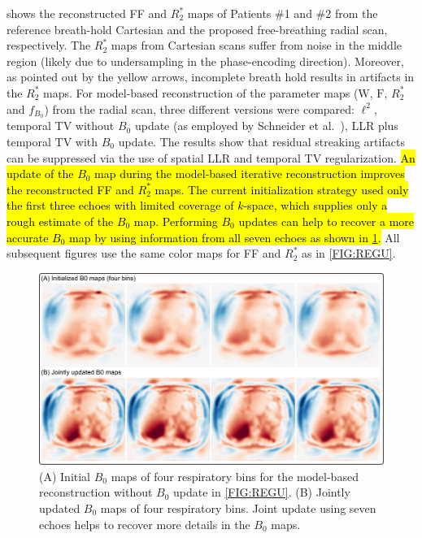 \documentclass[journal,twoside,web]{ieeecolor}
\begin{document}
 shows the reconstructed FF and $R_2^*$ maps of Patients \#1 and \#2
from the reference breath-hold Cartesian and the proposed free-breathing radial scan, 
respectively. 
The $R_2^*$ maps from Cartesian scans suffer from noise in the middle region 
(likely due to undersampling in the phase-encoding direction). 
Moreover, as pointed out by the yellow arrows, 
incomplete breath hold results in artifacts in the $R_2^*$ maps.
For model-based reconstruction of the parameter
maps ($\mathrm{W}$, $\mathrm{F}$, $R_2^*$ and $f_{B_0}$) 
from the radial scan, three different versions were compared: 
$\ell^2$, temporal TV without $B_0$ update 
(as employed by Schneider et al.~\cite{schneider_2020_mobawfr2s}), 
LLR plus temporal TV with $B_0$ update. 
The results show that residual streaking artifacts can be suppressed 
via the use of spatial LLR and temporal TV regularization.
\hl{An update of the $B_0$ map during the model-based iterative reconstruction
improves the reconstructed FF and $R_2^*$ maps. The current initialization
strategy used 
only the first three echoes with limited coverage of $k$-space, 
which supplies only a rough estimate of the $B_0$ map.
Performing $B_0$ updates can help to recover a more accurate $B_0$ map
by using information from all seven echoes as shown in \mbox{\cref{FIG:B0}}.}
All subsequent figures use 
the same color maps for FF and $R_2^*$ as in \cref{FIG:REGU}.

\begin{figure}
	\centering
	\includegraphics[width=\textwidth]{../../figures/tan6.pdf}
	\caption{(A) Initial $B_0$ maps of four respiratory bins 
		for the model-based reconstruction without $B_0$ update in \cref{FIG:REGU}.
		(B) Jointly updated $B_0$ maps of four respiratory bins. 
		Joint update using seven echoes helps to recover more details in 
		the $B_0$ maps.}
	\label{FIG:B0}
\end{figure}
\end{document}

